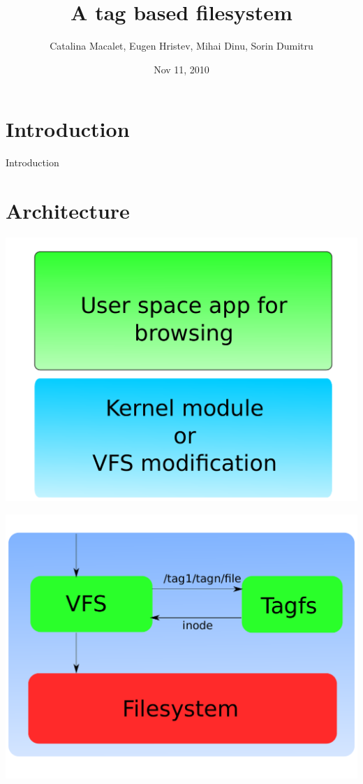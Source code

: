 \documentclass{beamer}
\title[TagFS]{A tag based filesystem}
\author{Catalina Macalet, Eugen Hristev, Mihai Dinu, Sorin Dumitru}
\institute{Politehnic University of Bucharest}
\date{Nov 11, 2010}
\begin{document}
\begin{frame}
  \titlepage
\end{frame}

\section{Introduction}

\begin{frame}{Introduction}
\end{frame}

\section{Architecture}

\begin{frame}
  \includegraphics[scale=0.6]{art/archall.pdf}
\end{frame}

\begin{frame}
  \includegraphics[scale=0.6]{art/archdetail.pdf}
\end{frame}
\end{document}
